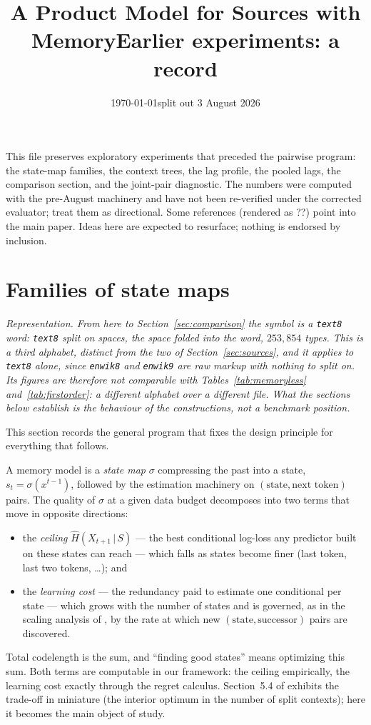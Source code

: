 \documentclass[11pt]{article}
\title{A Product Model for Sources with Memory}
\author{}
\date{\today}
\begin{document}
\title{Earlier experiments: a record}
\date{split out 3 August 2026}
\maketitle

\noindent This file preserves exploratory experiments that
preceded the pairwise program: the state-map families, the
context trees, the lag profile, the pooled lags, the
comparison section, and the joint-pair diagnostic.  The
numbers were computed with the pre-August machinery and have
not been re-verified under the corrected evaluator; treat
them as directional.  Some references (rendered as ??) point
into the main paper.  Ideas here are expected to resurface;
nothing is endorsed by inclusion.

\section{Families of state maps}
\label{sec:states}

\emph{Representation.  From here to
Section~\ref{sec:comparison} the symbol is a \texttt{text8} word:
\texttt{text8} split on spaces, the space folded into the word,
$253{,}854$ types.  This is a third alphabet, distinct from the two of
Section~\ref{sec:sources}, and it applies to \texttt{text8} alone, since
\texttt{enwik8} and \texttt{enwik9} are raw markup with nothing to
split on.  Its figures are therefore not comparable with
Tables~\ref{tab:memoryless} and~\ref{tab:firstorder}: a different
alphabet over a different file.  What the sections below establish is
the behaviour of the constructions, not a benchmark position.}

This section records the general program that fixes the design
principle for everything that follows.

A memory model is a \emph{state map} $\sigma$ compressing the past into a
state, $s_t=\sigma(x^{t-1})$, followed by the estimation machinery on
$(\text{state},\text{next token})$ pairs.  The quality of $\sigma$ at a
given data budget decomposes into two terms that move in opposite
directions:
\begin{itemize}
\item the \emph{ceiling} $\hat H(X_{t+1}\,|\,S)$ --- the best conditional
  log-loss any predictor built on these states can reach --- which falls as
  states become finer (last token, last two tokens, \dots); and
\item the \emph{learning cost} --- the redundancy paid to estimate one
  conditional per state --- which grows with the number of states and is
  governed, as in the scaling analysis of \cite{layered2026}, by the rate
  at which new $(\text{state},\text{successor})$ pairs are discovered.
\end{itemize}
Total codelength is the sum, and ``finding good states'' means optimizing
this sum.  Both terms are computable in our framework: the ceiling
empirically, the learning cost exactly through the regret calculus.
Section~5.4 of \cite{layered2026} exhibits the trade-off in miniature (the
interior optimum in the number of split contexts); here it becomes the main
object of study.
\end{document}
